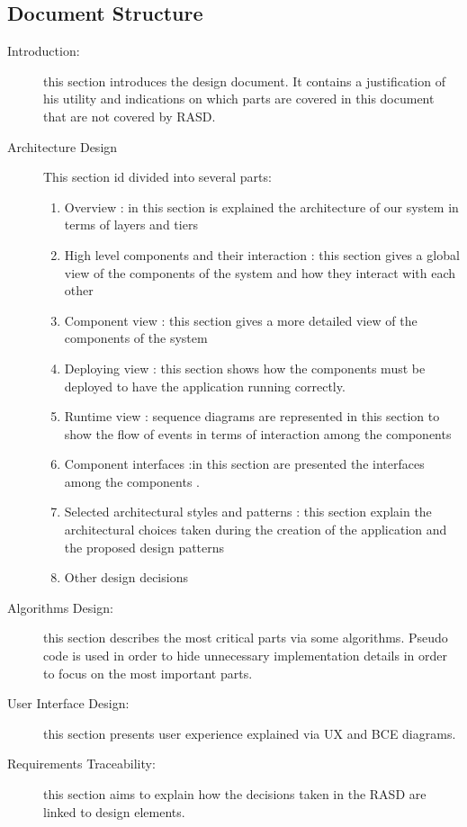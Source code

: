\documentclass{article}
\begin{document}
\begin{flushleft}
\subsection{Document Structure} %
\begin{description}
\item [Introduction:] this section introduces the design document. It contains a justification of his utility and indications on which parts are covered in this document that are not covered by RASD. 
\item  [Architecture Design ]  This section id divided into several parts:
\begin {enumerate}
\item  Overview : in this section is explained the architecture of our system in terms of layers and tiers
\item High level components and their interaction : this section gives a global view of the components of the system and how they interact with each other
\item Component view : this section gives a more detailed view of the components of the system
\item Deploying view : this section shows how the components must be deployed to have the application running correctly. 
\item Runtime view : sequence diagrams are represented in this section to show the flow of events in terms of interaction among the components
\item Component interfaces :in this section are presented the interfaces among the components .
\item Selected architectural styles and patterns : this section explain the architectural choices taken during the creation of the application and the proposed design patterns 
\item Other design decisions 
\end{enumerate}
\item  [Algorithms Design:] this section describes the most critical parts via some algorithms. Pseudo code is used in order to hide unnecessary implementation details in order to focus on the most important parts.
\item  [User Interface Design:] this section presents user experience explained via UX and BCE diagrams. 
\item  [Requirements Traceability:] this section aims to explain how the decisions taken in the RASD are linked to design elements.
\end{description}


\end{flushleft}
\end{document}
